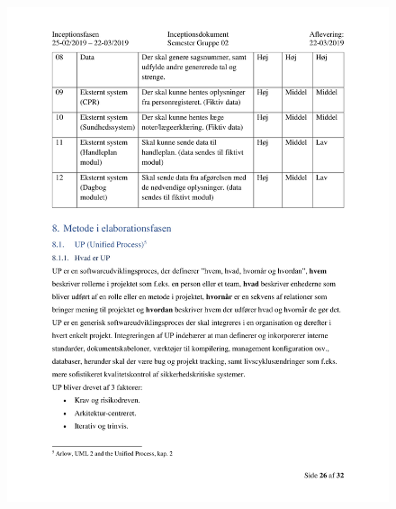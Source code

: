 \begin{figure}[hb]
  \includegraphics[scale = 0.33]{./PNG/Inceptions/Gruppe02+InceptionsDokument-27.jpg} 
\end{figure}

